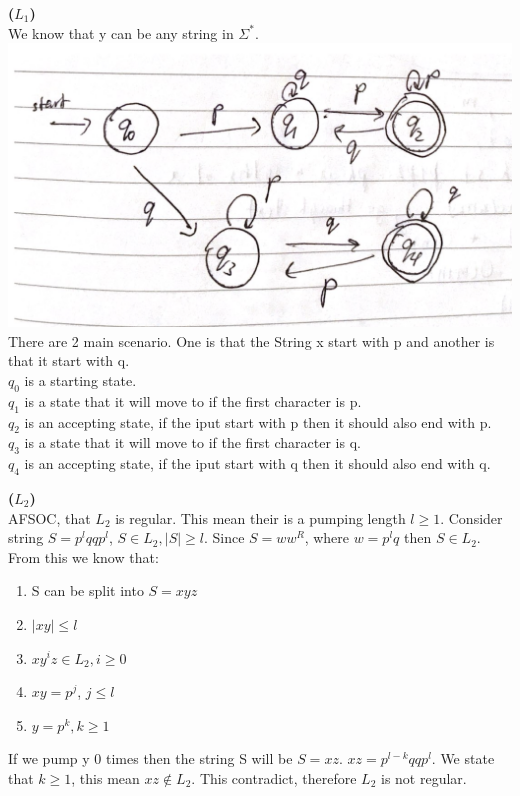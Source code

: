 \documentclass[a4paper, 11pt]{article}
\renewcommand{\part}[1] {\vspace{.10in} {\bf (#1)}}
\begin{document}
\part{$L_1$}\\
We know that y can be any string in $\Sigma^*$. \\
\includegraphics[width=\textwidth]{Q2-1-2.png}\\
There are 2 main scenario. One is that the String x start with p and another is that it start with q.\\
$q_0$ is a starting state.\\
$q_1$ is a state that it will move to if the first character is p.\\
$q_2$ is an accepting state, if the iput start with p then it should also end with p.\\
$q_3$ is a state that it will move to if the first character is q.\\
$q_4$ is an accepting state, if the iput start with q then it should also end with q.

\part{$L_2$}\\
AFSOC, that $L_2$ is regular. This mean their is a pumping length $l \geq 1$.  Consider string $S = p^lqqp^l$, $S \in L_2, |S| \geq l$. Since $S = ww^R$, where $w = p^lq$ then $S \in L_2$. From this we know that:
\begin{enumerate}
	\item S can be split into $S = xyz$
	\item $|xy| \leq l$
	\item $xy^iz \in L_2, i \geq 0$
	\item $xy = p^j$, $j \leq l$
	\item $y = p^k, k \geq 1$
\end{enumerate}
If we pump y 0 times then the string S will be $S = xz$. $xz = p^{l-k}qqp^l$. We state that $k \geq 1$, this mean $xz \notin L_2$. This contradict, therefore $L_2$ is not regular.
\end{document}
